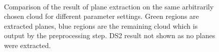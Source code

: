 \documentclass[11pt,a4paper]{kth-mag}
\begin{document}
\begin{figure}
{    \\
  }
  \centerline{
  }
  \caption{Comparison of the result of plane extraction on the same arbitrarily
    chosen cloud for different parameter settings. Green regions are extracted
    planes, blue regions are the remaining cloud which is output by the
    preprocessing step. DS2 result not shown as no planes were extracted.}
  \label{fig:ransaciter}
\end{figure}
\end{document}
